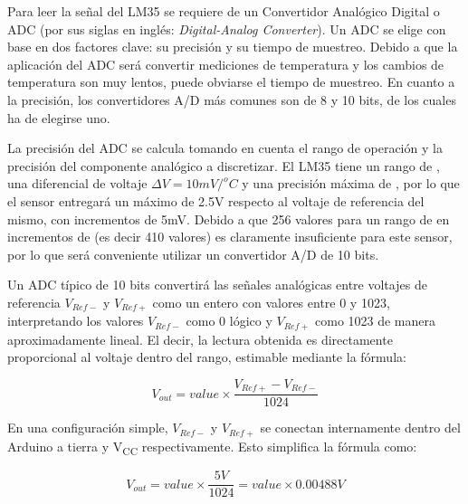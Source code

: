 %
%



Para leer la señal del LM35 se requiere de un Convertidor Analógico Digital o ADC (por sus siglas en inglés: \emph{Digital-Analog Converter}).
Un ADC se elige con base en dos factores clave: su precisión y su tiempo de muestreo.
Debido a que la aplicación del ADC será convertir mediciones de temperatura y los cambios de temperatura son muy lentos,\footnotemark{} puede obviarse el tiempo de muestreo.
En cuanto a la precisión, los convertidores A/D más comunes son de 8 y 10 bits, de los cuales ha de elegirse uno.

La precisión del ADC se calcula tomando en cuenta el rango de operación y la precisión del componente analógico a discretizar.
El LM35 tiene un rango de , una diferencial de voltaje $\Delta{}V=10mV/^{o}C$ y una precisión máxima de , por lo que el sensor entregará un máximo de 2.5V respecto al voltaje de referencia del mismo, con incrementos de 5mV.
Debido a que 256 valores para un rango de  en incrementos de  (es decir 410 valores) es claramente insuficiente para este sensor, por lo que será conveniente utilizar un convertidor A/D de 10 bits.

Un ADC típico de 10 bits convertirá las señales analógicas entre voltajes de referencia $V_{Ref-}$ y $V_{Ref+}$ como un entero con valores entre 0 y 1023, interpretando los valores $V_{Ref-}$ como 0 lógico y $V_{Ref+}$ como 1023 de manera aproximadamente lineal.
El decir, la lectura obtenida es directamente proporcional al voltaje dentro del rango, estimable mediante la fórmula:

\begin{equation}
V_{out}= value \times \frac{ V_{Ref+} - V_{Ref-} }{ 1024 }
\end{equation}

En una configuración simple, $V_{Ref-}$ y $V_{Ref+}$ se conectan internamente dentro del Arduino a tierra y V\textsubscript{CC} respectivamente. Esto simplifica la fórmula como:

\begin{equation}
V_{out}= value \times \frac{ 5V }{ 1024 } = value \times 0.00488V
\end{equation}

